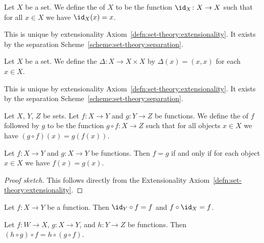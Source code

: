 \begin{definition}
Let $X$ be a set. We define the  of $X$ to
be the function $\id_{X}\colon X\to X$ such that for all $x\in X$ we
have $\id_{X}(x)=x$.

This is unique by extensionality Axiom~\ref{defn:set-theory:extensionality}. It exists by the separation Scheme~\ref{scheme:set-theory:separation}.
\end{definition}

\begin{definition}\label{defn:set-theory:diagonal-function}
Let $X$ be a set. We define the 
$\Delta\colon X\to X\times X$ by $\Delta(x)=(x,x)$ for each $x\in X$.

This is unique by extensionality Axiom~\ref{defn:set-theory:extensionality}. It exists by the separation Scheme~\ref{scheme:set-theory:separation}.
\end{definition}

\begin{definition}
Let $X$, $Y$, $Z$ be sets. Let $f\colon X\to Y$ and $g\colon Y\to Z$
be functions. We define the  of $f$ followed by
$g$ to be the function $g\circ f\colon X\to Z$ such that for all
objects $x\in X$ we have $(g\circ f)(x)=g(f(x))$.
\end{definition}

\begin{theorem}
Let $f\colon X\to Y$ and $g\colon X\to Y$ be functions.
Then $f=g$ if and only if for each object $x\in X$ we have $f(x)=g(x)$.
\end{theorem}

\begin{proof}[Proof sketch]
This follows directly from the Extensionality Axiom~\ref{defn:set-theory:extensionality}.
\end{proof}

\begin{theorem}
Let $f\colon X\to Y$ be a function.
Then $\id_{Y}\circ f=f$ and $f\circ\id_{X}=f$.
\end{theorem}

\begin{theorem}
Let $f\colon W\to X$, $g\colon X\to Y$, and $h\colon Y\to Z$ be functions.
Then $(h\circ g)\circ f=h\circ(g\circ f)$.
\end{theorem}

